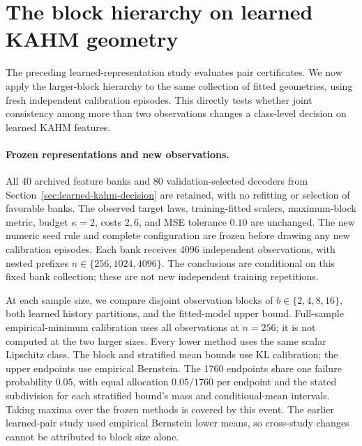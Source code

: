 \section{The block hierarchy on learned KAHM geometry}
\label{sec:learned-kahm-hierarchy}

The preceding learned-representation study evaluates pair certificates.
We now apply the larger-block hierarchy to the same collection of fitted
geometries, using fresh independent calibration episodes. This directly tests
whether joint consistency among more than two observations changes a
class-level decision on learned KAHM features.

\paragraph{Frozen representations and new observations.}
All 40 archived feature banks and 80 validation-selected decoders from
Section~\ref{sec:learned-kahm-decision} are retained, with no refitting or
selection of favorable banks. The observed target laws, training-fitted
scalers, maximum-block metric, budget $\kappa=2$, costs $2,6$, and MSE
tolerance $0.10$ are unchanged. The new numeric seed rule and complete
configuration are frozen before drawing any new calibration episodes.
Each bank receives 4096 independent observations, with nested prefixes
$n\in\{256,1024,4096\}$. The conclusions are conditional on this fixed
bank collection; these are not new independent training repetitions.

At each sample size, we compare disjoint observation blocks of
$b\in\{2,4,8,16\}$, both learned history partitions, and the fitted-model
upper bound. Full-sample empirical-minimum calibration uses all observations
at $n=256$; it is not computed at the two larger sizes. Every lower method
uses the same scalar Lipschitz class. The block and stratified mean bounds use
KL calibration; the upper endpoints use empirical Bernstein. The 1760
endpoints share one failure probability $0.05$, with equal allocation
$0.05/1760$ per endpoint and the stated subdivision for each stratified
bound's mass and conditional-mean intervals. Taking maxima over the frozen
methods is covered by this event. The earlier learned-pair study used
empirical Bernstein lower means, so cross-study changes cannot be attributed
to block size alone.



